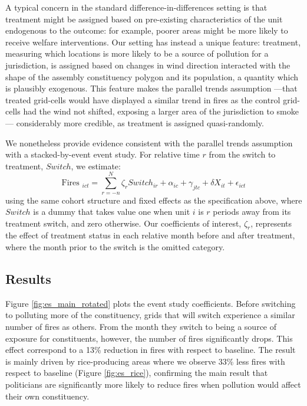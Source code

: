 \documentclass[12pt]{article}
\begin{document}
A typical concern in the standard difference-in-differences setting is that treatment might be assigned based on pre-existing characteristics of the unit endogenous to the outcome: for example, poorer areas might be more likely to receive welfare interventions. Our setting has instead a unique feature: treatment, measuring which locations is more likely to be a source of pollution for a jurisdiction, is assigned based on changes in wind direction interacted with the shape of the assembly constituency polygon and its population, a quantity which is plausibly exogenous. This feature makes the parallel trends assumption  ---that treated grid-cells would have displayed a similar trend in fires as the control grid-cells had the wind not shifted, exposing a larger area of the jurisdiction to smoke--- considerably more credible, as treatment is assigned quasi-randomly. 

We nonetheless provide evidence consistent with the parallel trends assumption with a stacked-by-event event study. For relative time $r$ from the switch to treatment, $Switch$, we estimate:
\begin{equation}\label{eq2}
 \text{Fires }_{ict}= \sum_{r=-n}^{N} \zeta_r Switch_{ir} + \alpha_{ic}+ \gamma_{jtc}+ \delta X_{it} + \epsilon_{ict}
\end{equation}
using the same cohort structure and fixed effects as the specification above, where $Switch$ is a dummy that takes value one when unit $i$ is $r$ periods away from its treatment switch, and zero otherwise. 
Our coefficients of interest, $\zeta_r$, represents the effect of treatment status in each relative month before and after treatment, where the month prior to the switch is the omitted category. 


\subsection{Results\label{ssec:results1}}

Figure \ref{fig:es_main_rotated} plots the event study coefficients. Before switching to polluting more of the constituency, grids that will switch experience a similar number of fires as others. From the month they switch to being a source of exposure for constituents, however, the number of fires significantly drops. This effect correspond to a 13\% reduction in fires with respect to baseline. The result is mainly driven by rice-producing areas where we observe 33\% less fires with respect to baseline (Figure \ref{fig:es_rice}), confirming the main result that politicians are significantly more likely to reduce fires when pollution would affect their own constituency. 
\end{document}

